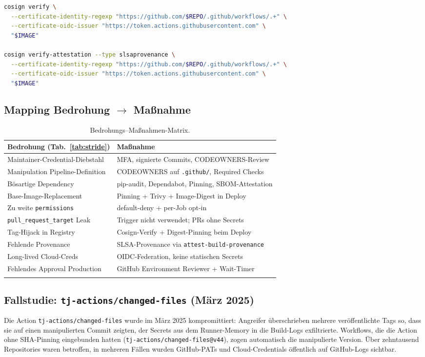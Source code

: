 \documentclass[12pt, a4paper]{scrartcl}
\begin{document}
\begin{lstlisting}[language=bash,caption={Verifikation vor Deploy (\texttt{cd.yml})},label={lst:verify}]
cosign verify \
  --certificate-identity-regexp "https://github.com/$REPO/.github/workflows/.+" \
  --certificate-oidc-issuer "https://token.actions.githubusercontent.com" \
  "$IMAGE"

cosign verify-attestation --type slsaprovenance \
  --certificate-identity-regexp "https://github.com/$REPO/.github/workflows/.+" \
  --certificate-oidc-issuer "https://token.actions.githubusercontent.com" \
  "$IMAGE"
\end{lstlisting}

\subsection{Mapping Bedrohung $\to$ Maßnahme}
\begin{longtable}{p{5.0cm} p{9.5cm}}
\toprule
\textbf{Bedrohung (Tab.~\ref{tab:stride})} & \textbf{Maßnahme} \\
\midrule \endhead
Maintainer-Credential-Diebstahl & MFA, signierte Commits, CODEOWNERS-Review \\
Manipulation Pipeline-Definition & CODEOWNERS auf \texttt{.github/}, Required Checks \\
Bösartige Dependency & pip-audit, Dependabot, Pinning, SBOM-Attestation \\
Base-Image-Replacement & Pinning + Trivy + Image-Digest in Deploy \\
Zu weite \texttt{permissions} & default-deny + per-Job opt-in \\
\texttt{pull\_request\_target} Leak & Trigger nicht verwendet; PRs ohne Secrets \\
Tag-Hijack in Registry & Cosign-Verify + Digest-Pinning beim Deploy \\
Fehlende Provenance & SLSA-Provenance via \texttt{attest-build-provenance} \\
Long-lived Cloud-Creds & OIDC-Federation, keine statischen Secrets \\
Fehlendes Approval Production & GitHub Environment Reviewer + Wait-Timer \\
\bottomrule
\caption{Bedrohungs--Maßnahmen-Matrix.}
\end{longtable}

\subsection{Fallstudie: \texttt{tj-actions/changed-files} (März 2025)}
\label{sec:tjactions}
Die Action \texttt{tj-actions/changed-files} wurde im März 2025
kompromittiert: Angreifer überschrieben mehrere veröffentlichte Tags so,
dass sie auf einen manipulierten Commit zeigten, der Secrets aus dem
Runner-Memory in die Build-Logs exfiltrierte. Workflows, die die Action
ohne SHA-Pinning eingebunden hatten (\texttt{tj-actions/changed-files@v44}),
zogen automatisch die manipulierte Version. Über zehntausend Repositories
waren betroffen, in mehreren Fällen wurden GitHub-PATs und Cloud-Credentials
öffentlich auf GitHub-Logs sichtbar.
\end{document}
